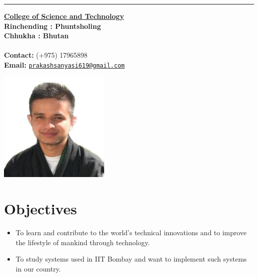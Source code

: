 \documentclass[10pt]{article}
\renewcommand{\maketitle}{
	\begin{center}
	{\bfseries \Huge
	\theauthor}
	\rule{17.5cm}{1pt}
	\end{center}	
}
\begin{document}
	\author{Prakash Sanyasi}
	\maketitle
	
	\begin{minipage}{0.5\linewidth}
		\href{http://cst.edu.bt/}{\bf College of Science and Technology} \\
		{\bf Rinchending : Phuntsholing} \\
		{\bf Chhukha : Bhutan}\\ \\
		{\bf Contact: } (+975) 17965898 \\
		{\bf Email: } \href{mailto:prakashsanyasi619@gmail.com}{\tt prakashsanyasi619@gmail.com} \\
	\end{minipage}
	\begin{minipage}{0.45\linewidth}
		\raggedleft
		\includegraphics[width=0.4\textwidth]{cover_photo}
	\end{minipage}

	\vspace{0.5cm}
	\section{Objectives}
	\begin{itemize}
		\item  To learn and contribute to the world’s technical innovations and to improve the lifestyle of mankind through technology.
		\item  To study systems used in IIT Bombay and want to implement such systems in our country.
	\end{itemize}

 
\end{document}
